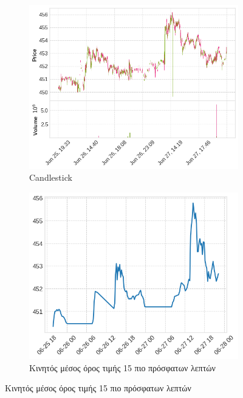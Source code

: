 \documentclass[12pt, a4paper]{article}
\begin{document}
\begin{figure}[h!]
  \centering
  \begin{subfigure}[b]{0.45\textwidth}
    \centering
    \includegraphics[width=\textwidth]{msft_candlesticks.png}
    \caption{Candlestick}
    \label{fig:sub1}
  \end{subfigure}
  \hfill
  \begin{subfigure}[b]{0.45\textwidth}
    \centering
    \includegraphics[width=\textwidth]{msft_ma.png}
    \caption{Κινητός μέσος όρος τιμής 15 πιο πρόσφατων λεπτών}
    \label{fig:sub2}
  \end{subfigure}


\end{figure}
\end{document}
